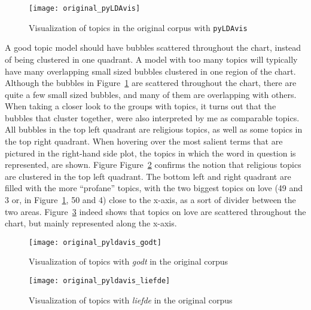 \begin{figure}[hbt!]
	\centering
	\texttt{[image: original\_pyLDAvis]}
	\caption{Visualization of topics in the original corpus with \texttt{pyLDAvis}}
	\label{fig:pyLDAvisOriginal}
\end{figure}

\noindent A good topic model should have bubbles scattered throughout the chart, instead of being clustered in one quadrant. A model with too many topics will typically have many overlapping small sized bubbles clustered in one region of the chart. Although the bubbles in Figure~\ref{fig:pyLDAvisOriginal} are scattered throughout the chart, there are quite a few small sized bubbles, and many of them are overlapping with others. When taking a closer look to the groups with topics, it turns out that the bubbles that cluster together, were also interpreted by me as comparable topics. All bubbles in the top left quadrant are religious topics, as well as some topics in the top right quadrant. When hovering over the most salient terms that are pictured in the right-hand side plot, the topics in which the word in question is represented, are shown. Figure Figure~\ref{fig:pyLDAvisOriginal_godt} confirms the notion that religious topics are clustered in the top left quadrant. The bottom left and right quadrant are filled with the more \enquote{profane} topics, with the two biggest topics on love (49 and 3 or, in Figure~\ref{fig:pyLDAvisOriginal}, 50 and 4) close to the x-axis, as a sort of divider between the two areas. Figure~\ref{fig:pyLDAvisOriginal_liefde} indeed shows that topics on love are scattered throughout the chart, but mainly represented along the x-axis.

\begin{figure}[hbt!]
	\centering
	\texttt{[image: original\_pyldavis\_godt]}
	\caption{Visualization of topics with \textit{godt} in the original corpus}
	\label{fig:pyLDAvisOriginal_godt}
\end{figure}

\begin{figure}[hbt!]
	\centering
	\texttt{[image: original\_pyldavis\_liefde]}
	\caption{Visualization of topics with \textit{liefde} in the original corpus}
	\label{fig:pyLDAvisOriginal_liefde}
\end{figure}

